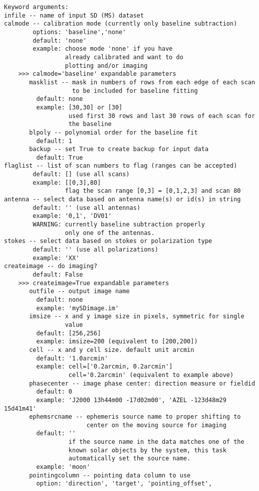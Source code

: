 \begin{verbatim}
Keyword arguments:
infile -- name of input SD (MS) dataset
calmode -- calibration mode (currently only baseline subtraction)
        options: 'baseline','none'
        default: 'none'
        example: choose mode 'none' if you have
                 already calibrated and want to do
                 plotting and/or imaging 
    >>> calmode='baseline' expandable parameters
       masklist -- mask in numbers of rows from each edge of each scan 
                   to be included for baseline fitting
         default: none
         example: [30,30] or [30] 
                  used first 30 rows and last 30 rows of each scan for 
                  the baseline 
       blpoly -- polynomial order for the baseline fit
         default: 1
       backup -- set True to create backup for input data
         default: True
flaglist -- list of scan numbers to flag (ranges can be accepted)  
        default: [] (use all scans)
        example: [[0,3],80]
                 flag the scan range [0,3] = [0,1,2,3] and scan 80 
antenna -- select data based on antenna name(s) or id(s) in string
        default: '' (use all antennas)
        example: '0,1', 'DV01'
        WARNING: currently baseline subtraction properly 
                 only one of the antennas.
stokes -- select data based on stokes or polarization type 
        default: '' (use all polarizations)
        example: 'XX'
createimage -- do imaging? 
        default: False 
    >>> createimage=True expandable parameters
       outfile -- output image name
         default: none
         example: 'mySDimage.im'
       imsize -- x and y image size in pixels, symmetric for single 
                 value
         default: [256,256]
         example: imsize=200 (equivalent to [200,200])
       cell -- x and y cell size. default unit arcmin
         default: '1.0arcmin'
         example: cell=['0.2arcmin, 0.2arcmin']
                  cell='0.2arcmin' (equivalent to example above)
       phasecenter -- image phase center: direction measure or fieldid 
         default: 0
         example: 'J2000 13h44m00 -17d02m00', 'AZEL -123d48m29 15d41m41'
       ephemsrcname -- ephemeris source name to proper shifting to 
                       center on the moving source for imaging
         default: ''
                  if the source name in the data matches one of the 
                  known solar objects by the system, this task 
                  automatically set the source name. 
         example: 'moon' 
       pointingcolumn -- pointing data column to use
         option: 'direction', 'target', 'pointing_offset', 

\end{verbatim}
